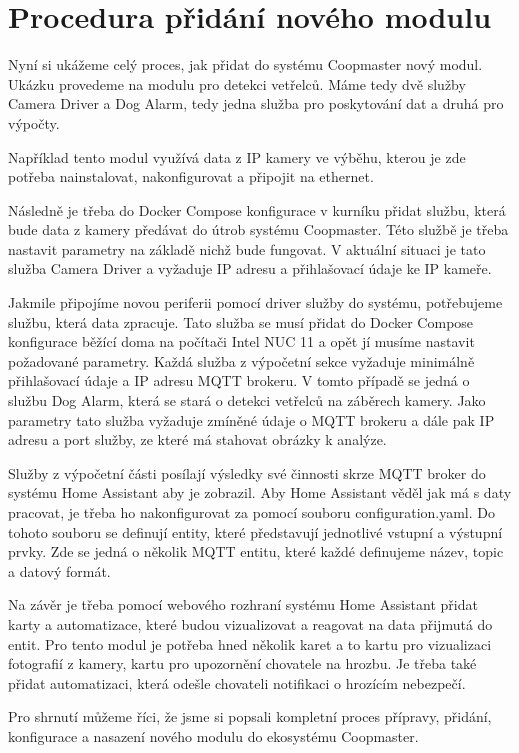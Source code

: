 \section*{Procedura přidání nového modulu}


Nyní si ukážeme celý proces, jak přidat do systému Coopmaster nový modul.
Ukázku provedeme na modulu pro detekci vetřelců.
Máme tedy dvě služby Camera Driver a Dog Alarm, tedy jedna služba pro poskytování dat a druhá pro výpočty.\newline

Například tento modul využívá data z IP kamery ve výběhu, kterou je zde potřeba nainstalovat, nakonfigurovat a připojit na ethernet.\newline

Následně je třeba do Docker Compose konfigurace v kurníku přidat službu, která bude data z kamery předávat do útrob systému Coopmaster.
Této službě je třeba nastavit parametry na základě nichž bude fungovat.
V aktuální situaci je tato služba Camera Driver a vyžaduje IP adresu a přihlašovací údaje ke IP kameře.\newline

Jakmile připojíme novou periferii pomocí driver služby do systému, potřebujeme službu, která data zpracuje.
Tato služba se musí přidat do Docker Compose konfigurace běžící doma na počítači Intel NUC 11 a opět jí musíme nastavit požadované parametry.
Každá služba z výpočetní sekce vyžaduje minimálně přihlašovací údaje a IP adresu MQTT brokeru.
V tomto případě se jedná o službu Dog Alarm, která se stará o detekci vetřelců na záběrech kamery.
Jako parametry tato služba vyžaduje zmíněné údaje o MQTT brokeru a dále pak IP adresu a port služby, ze které má stahovat obrázky k analýze.\newline

Služby z výpočetní části posílají výsledky své činnosti skrze MQTT broker do systému Home Assistant aby je zobrazil.
Aby Home Assistant věděl jak má s daty pracovat, je třeba ho nakonfigurovat za pomocí souboru configuration.yaml.
Do tohoto souboru se definují entity, které představují jednotlivé vstupní a výstupní prvky.
Zde se jedná o několik MQTT entitu, které každé definujeme název, topic a datový formát.\newline

Na závěr je třeba pomocí webového rozhraní systému Home Assistant přidat karty a automatizace, které budou vizualizovat a reagovat na data přijmutá do entit.
Pro tento modul je potřeba hned několik karet a to kartu pro vizualizaci fotografií z kamery, kartu pro upozornění chovatele na hrozbu.
Je třeba také přidat automatizaci, která odešle chovateli notifikaci o hrozícím nebezpečí.\newline

Pro shrnutí můžeme říci, že jsme si popsali kompletní proces přípravy, přidání, konfigurace a nasazení nového modulu do ekosystému Coopmaster.



